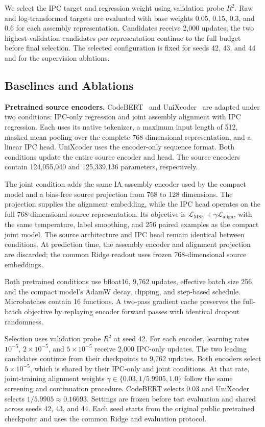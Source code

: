 \documentclass[conference]{IEEEtran}
\newcommand{\Rsq}{R^{2}}
\begin{document}
We select the IPC target and regression weight using validation probe $\Rsq$. Raw and log-transformed targets are evaluated with base weights 0.05, 0.15, 0.3, and 0.6 for each assembly representation. Candidates receive 2,000 updates; the two highest-validation candidates per representation continue to the full budget before final selection. The selected configuration is fixed for seeds 42, 43, and 44 and for the supervision ablations.

\subsection{Baselines and Ablations}
\textbf{Pretrained source encoders.} CodeBERT~\cite{feng2020codebert} and UniXcoder~\cite{unixcoder2022} are adapted under two conditions: IPC-only regression and joint assembly alignment with IPC regression. Each uses its native tokenizer, a maximum input length of 512, masked mean pooling over the complete 768-dimensional representation, and a linear IPC head. UniXcoder uses the encoder-only sequence format. Both conditions update the entire source encoder and head. The source encoders contain 124,055,040 and 125,339,136 parameters, respectively.

The joint condition adds the same IA assembly encoder used by the compact model and a bias-free source projection from 768 to 128 dimensions. The projection supplies the alignment embedding, while the IPC head operates on the full 768-dimensional source representation. Its objective is $\mathcal{L}_{\mathrm{MSE}}+\gamma\mathcal{L}_{\mathrm{align}}$, with the same temperature, label smoothing, and 256 paired examples as the compact joint model. The source architecture and IPC head remain identical between conditions. At prediction time, the assembly encoder and alignment projection are discarded; the common Ridge readout uses frozen 768-dimensional source embeddings.

Both pretrained conditions use bfloat16, 9,762 updates, effective batch size 256, and the compact model's AdamW decay, clipping, and step-based schedule. Microbatches contain 16 functions. A two-pass gradient cache preserves the full-batch objective by replaying encoder forward passes with identical dropout randomness.

Selection uses validation probe $\Rsq$ at seed 42. For each encoder, learning rates $10^{-5}$, $2\times10^{-5}$, and $5\times10^{-5}$ receive 2,000 IPC-only updates. The two leading candidates continue from their checkpoints to 9,762 updates. Both encoders select $5\times10^{-5}$, which is shared by their IPC-only and joint conditions. At that rate, joint-training alignment weights $\gamma\in\{0.03,1/5.9905,1.0\}$ follow the same screening and continuation procedure. CodeBERT selects 0.03 and UniXcoder selects $1/5.9905\approx0.16693$. Settings are frozen before test evaluation and shared across seeds 42, 43, and 44. Each seed starts from the original public pretrained checkpoint and uses the common Ridge and evaluation protocol.
\end{document}
